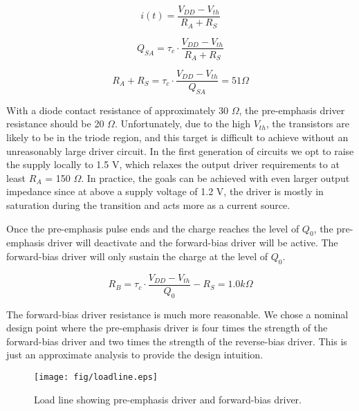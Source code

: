 	\begin{equation}
i(t) = \frac{V_{DD} - V_{th}}{R_{A} + R_{S}}
	\end{equation}

	\begin{equation}
Q_{SA} = \tau_c \cdot \frac{V_{DD} - V_{th}}{R_{A} + R_S}
	\end{equation}

	\begin{equation}
R_A + R_S = \tau_c \cdot \frac{V_{DD} - V_{th}}{Q_{SA}} = 51 \Omega
	\end{equation}

With a diode contact resistance of approximately 30 $\Omega$, the pre-emphasis driver resistance should be 20 $\Omega$.  Unfortunately, due to the high $V_{th}$, the transistors are likely to be in the triode region, and this target is difficult to achieve without an unreasonably large driver circuit.  In the first generation of circuits we opt to raise the supply locally to 1.5 V, which relaxes the output driver requirements to at least $R_A$ = 150 $\Omega$. In practice, the goals can be achieved with even larger output impedance since at above a supply voltage of 1.2 V, the driver is mostly in saturation during the transition and acts more as a current source.

Once the pre-emphasis pulse ends and the charge reaches the level of $Q_0$, the pre-emphasis driver will deactivate and the forward-bias driver will be active.  The forward-bias driver will only sustain the charge at the level of $Q_0$.

	\begin{equation}
R_B  = \tau_c \cdot \frac{V_{DD} - V_{th}}{Q_{0}} - R_S = 1.0 k \Omega
	\end{equation}

The forward-bias driver resistance is much more reasonable.  We chose a nominal design point where the pre-emphasis driver is four times the strength of the forward-bias driver and two times the strength of the reverse-bias driver.  This is just an approximate analysis to provide the design intuition. 

	\begin{figure}[H]
		\begin{center}
			\texttt{[image: fig/loadline.eps]}
			\caption{\label{fig:loadline}Load line showing pre-emphasis driver and forward-bias driver.}
		\end{center}
	\end{figure}




